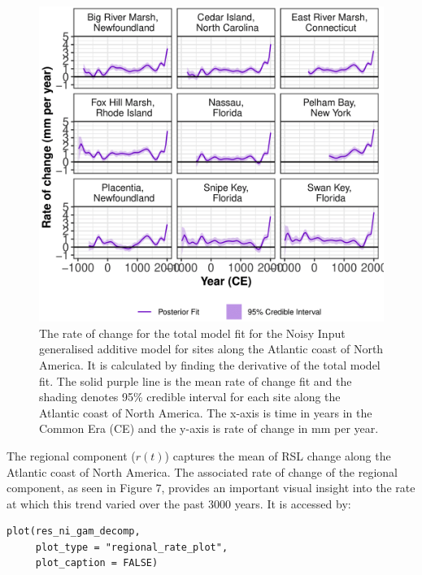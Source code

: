 \begin{figure}

{\centering \includegraphics[width=0.8\linewidth]{figures/niplotrate-1} 

}

\caption{The rate of change for the total model fit for the Noisy Input generalised additive model for sites along the Atlantic coast of North America. It is calculated by finding the derivative of the total model fit. The solid purple line is the mean rate of change fit and the shading denotes 95\% credible interval for each site along the Atlantic coast of North America. The x-axis is time in years in the Common Era (CE) and the y-axis is rate of change in mm per year.}\label{fig:niplotrateload}
\end{figure}

\normalsize

The regional component (\(r(t)\)) captures the mean of RSL change along the Atlantic coast of North America. The associated rate of change of the regional component, as seen in Figure 7, provides an important visual insight into the rate at which this trend varied over the past 3000 years. It is accessed by:
\scriptsize

\begin{verbatim}
plot(res_ni_gam_decomp, 
     plot_type = "regional_rate_plot",
     plot_caption = FALSE)
\end{verbatim}

